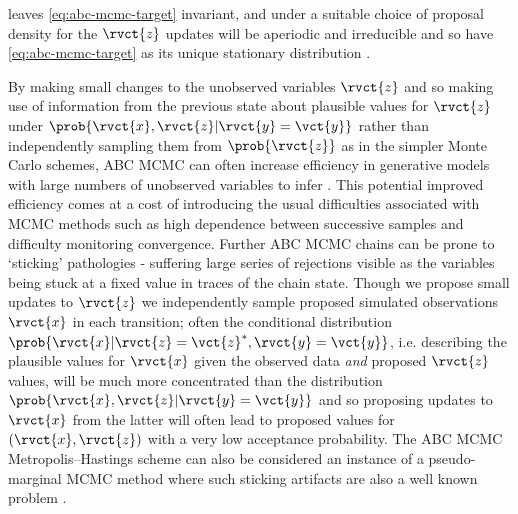  leaves \eqref{eq:abc-mcmc-target} invariant, and under a suitable choice of proposal density for the $\rvct{z}$ updates will be aperiodic and irreducible and so have \eqref{eq:abc-mcmc-target} as its unique stationary distribution \citep{marjoram2003markov,sisson2011likelihood}. 

By making small changes to the unobserved variables $\rvct{z}$ and so making use of information from the previous state about plausible values for $\rvct{z}$ under $\prob{\rvct{x},\rvct{z}|\rvct{y}=\vct{y}}$ rather than independently sampling them from $\prob{\rvct{z}}$ as in the simpler Monte Carlo schemes, \ac{ABC} \ac{MCMC} can often increase efficiency in generative models with large numbers of unobserved variables to infer \cite{sisson2011likelihood}. This potential improved efficiency comes at a cost of introducing the usual difficulties associated with \ac{MCMC} methods such as high dependence between successive samples and difficulty monitoring convergence. Further \ac{ABC} \ac{MCMC} chains can be prone to `sticking' pathologies - suffering large series of rejections visible as the variables being stuck at a fixed value in traces of the chain state. Though we propose small updates to $\rvct{z}$ we independently sample proposed simulated observations $\rvct{x}$ in each transition; often the conditional distribution $\prob{\rvct{x}|\rvct{z}=\vct{z}^*,\rvct{y}=\vct{y}}$, i.e. describing the plausible values for $\rvct{x}$ given the observed data \emph{and} proposed $\rvct{z}$ values, will be much more concentrated than the distribution $\prob{\rvct{x},\rvct{z}|\rvct{y}=\vct{y}}$ and so proposing updates to $\rvct{x}$ from the latter will often lead to proposed values for $(\rvct{x},\rvct{z})$ with a very low acceptance probability.
The \ac{ABC} \ac{MCMC} Metropolis--Hastings scheme can also be considered an instance of a pseudo-marginal \ac{MCMC} method \citep{beaumont2002approximate,andrieu2009pseudo} where such sticking artifacts are also a well known problem \citep{murray2010slice}. %


